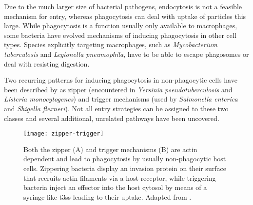 Due to the much larger size of bacterial pathogens, endocytosis is not a feasible mechanism for entry, whereas phagocytosis can deal with uptake of particles this large. While phagocytosis is a function usually only available to macrophages, some bacteria have evolved mechanisms of inducing phagocytosis in other cell types. Species explicitly targeting macrophages, such as \textit{Mycobacterium tuberculosis} and \textit{Legionella pneumophila}, have to be able to escape phagosomes or deal with resisting digestion.

Two recurring patterns for inducing phagocytosis in non-phagocytic cells have been described by \citet{Cossart2004} as zipper (encountered in \textit{Yersinia pseudotuberculosis} and \textit{Listeria monocytogenes}) and trigger mechanisms (used by \textit{Salmonella enterica} and \textit{Shigella flexneri}). Not all entry strategies can be assigned to these two classes and several additional, unrelated pathways have been uncovered.

\begin{figure}
  \centering
  \texttt{[image: zipper-trigger]}
  \caption[Zipper and trigger mechanisms for bacterial host-cell entry.]{Both the zipper (A) and trigger mechanisms (B) are actin dependent and lead to phagocytosis by usually non-phagocytic host cells. Zippering bacteria display an invasion protein on their surface that recruits actin filaments via a host receptor, while triggering bacteria inject an effector into the host cytosol by means of a syringe like \acrlong{t3ss} leading to their uptake. Adapted from \citet{Haglund2011}.}
  \label{fig:zipper-trigger}
\end{figure}

\label{zipper-mechanism}

